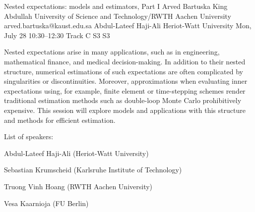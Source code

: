 \begin{talk}
  {Nested expectations: models and estimators, Part I}%
  {Arved Bartuska}%
  {King Abdullah University of Science and Technology/RWTH Aachen University}%
  {arved.bartuska@kaust.edu.sa}%
  {Abdul-Lateef Haji-Ali}%
  {Heriot-Watt University}%
  {Mon, July 28 10:30–12:30 Track C}%
  {S3}%
  {S3}%

Nested expectations 
arise in many applications, such as in engineering, mathematical finance, and medical decision-making. In addition to their nested structure, numerical estimations of such expectations are often complicated by singularities or discontinuities. Moreover, approximations when evaluating inner expectations using, for example, finite element or time-stepping schemes render traditional estimation methods such as double-loop Monte Carlo prohibitively expensive. This session will explore models and applications with this structure and methods for efficient estimation.

List of speakers:

Abdul-Lateef Haji-Ali (Heriot-Watt University)

Sebastian Krumscheid (Karlsruhe Institute of Technology)

Truong Vinh Hoang (RWTH Aachen University)

Vesa Kaarnioja (FU Berlin)

\end{talk}

